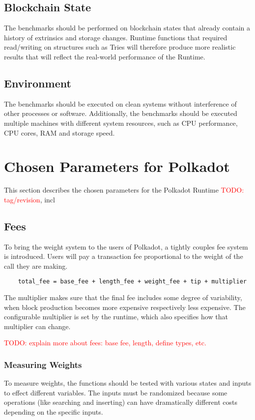 \documentclass[11pt,a4paper]{article}
\newcommand{\todo}[1]{\textcolor{red}{TODO: #1}}
\begin{document}
\subsection{Blockchain State}
The benchmarks should be performed on blockchain states that already contain a history of
extrinsics and storage changes. Runtime functions that required read/writing on structures
such as Tries will therefore produce more realistic results that will reflect the real-world
performance of the Runtime.

\subsection{Environment}
The benchmarks should be executed on clean systems without interference of other processes
or software. Additionally, the benchmarks should be executed multiple machines with different
system resources, such as CPU performance, CPU cores, RAM and storage speed.

\section{Chosen Parameters for Polkadot}
This section describes the chosen parameters for the Polkadot Runtime \todo{tag/revision},
incl

\subsection{Fees}
To bring the weight system to the users of Polkadot, a tightly couples fee system
is introduced. Users will pay a transaction fee proportional to the weight of the
call they are making.

\begin{verbatim}
    total_fee = base_fee + length_fee + weight_fee + tip + multiplier
\end{verbatim}

The multiplier makes sure that the final fee includes some degree of variability,
when block production becomes more expensive respectively less expensive.
The configurable multiplier is set by the runtime, which also specifies how that
multiplier can change.
\newline

\todo{explain more about fees: base fee, length, define types, etc.}

\subsubsection{Measuring Weights}
To measure weights, the functions should be tested with various states and inputs
to effect different variables. The inputs must be randomized because some operations
(like searching and inserting) can have dramatically different costs depending on
the specific inputs.
\newline
\end{document}
